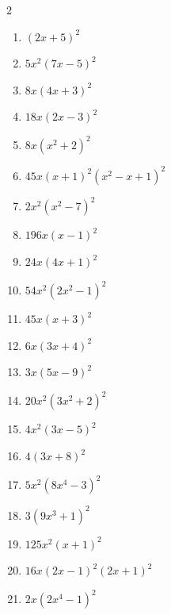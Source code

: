 \documentclass[11pt,oneside]{book}
\begin{document}
\begin{multicols}{2}
\begin{enumerate}[leftmargin=*,label=\textbf{C\arabic*.},itemsep=0.45\baselineskip]
\item $ \left(2 x + 5\right)^{2} $
\item $ 5 x^{2} \left(7 x - 5\right)^{2} $
\item $ 8 x \left(4 x + 3\right)^{2} $
\item $ 18 x \left(2 x - 3\right)^{2} $
\item $ 8 x \left(x^{2} + 2\right)^{2} $
\item $ 45 x \left(x + 1\right)^{2} \left(x^{2} - x + 1\right)^{2} $
\item $ 2 x^{2} \left(x^{2} - 7\right)^{2} $
\item $ 196 x \left(x - 1\right)^{2} $
\item $ 24 x \left(4 x + 1\right)^{2} $
\item $ 54 x^{2} \left(2 x^{2} - 1\right)^{2} $
\item $ 45 x \left(x + 3\right)^{2} $
\item $ 6 x \left(3 x + 4\right)^{2} $
\item $ 3 x \left(5 x - 9\right)^{2} $
\item $ 20 x^{2} \left(3 x^{2} + 2\right)^{2} $
\item $ 4 x^{2} \left(3 x - 5\right)^{2} $
\item $ 4 \left(3 x + 8\right)^{2} $
\item $ 5 x^{2} \left(8 x^{4} - 3\right)^{2} $
\item $ 3 \left(9 x^{3} + 1\right)^{2} $
\item $ 125 x^{2} \left(x + 1\right)^{2} $
\item $ 16 x \left(2 x - 1\right)^{2} \left(2 x + 1\right)^{2} $
\item $ 2 x \left(2 x^{4} - 1\right)^{2} $
\end{enumerate}
\end{multicols}
\end{document}
